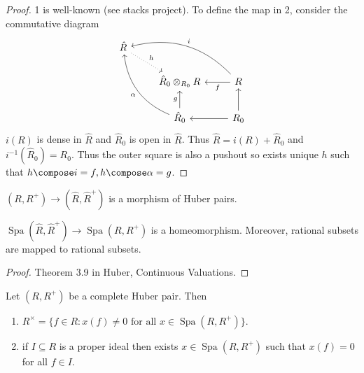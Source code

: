 \documentclass[a4paper]{article}
\DeclareMathOperator{\Spa}{Spa}
\begin{document}
\begin{proof}
  1 is well-known (see stacks project). To define the map in 2, consider the commutative diagram
  \[
    \begin{tikzcd}
      \hat R \ar[dr, dotted, "h"] \\
      & \hat R_0 \otimes_{R_0} R & R \ar[l, "f"] \ar[ull, "i"', bend right] \\
      & \hat R_0 \ar[u, "g"] \ar[uul, "\alpha", bend left] & R_0 \ar[l] \ar[u]
    \end{tikzcd}
  \]
  \(i(R)\) is dense in \(\hat R\) and \(\hat R_0\) is open in \(\hat R\). Thus \(\hat R = i(R) + \hat R_0\) and \(i^{-1}(\hat R_0) = R_0\). Thus the outer square is also a pushout so exists unique \(h\) such that \(h \compose i = f, h \compose \alpha = g\).
\end{proof}

\begin{corollary}
  \((R, R^+) \to (\hat R, \hat R^+)\) is a morphism of Huber pairs.
\end{corollary}

\begin{theorem}
  \(\Spa(\hat R, \hat R^+) \to \Spa(R, R^+)\) is a homeomorphism. Moreover, rational subsets are mapped to rational subsets.
\end{theorem}

\begin{proof}
  Theorem 3.9 in Huber, Continuous Valuations.
\end{proof}

\begin{proposition}
  Let \((R, R^+)\) be a complete Huber pair. Then
  \begin{enumerate}
  \item \(R^\times = \{f \in R: x(f) \ne 0 \text{ for all } x \in \Spa(R, R^+)\}\).
  \item if \(I \subseteq R\) is a proper ideal then exists \(x \in \Spa(R, R^+)\) such that \(x(f) = 0\) for all \(f \in I\).
  \end{enumerate}
\end{proposition}
\end{document}
